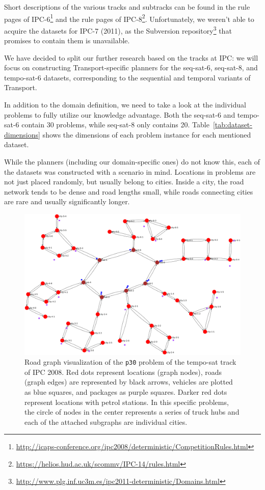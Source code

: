 Short descriptions of the various tracks and subtracks can be found in the rule pages of IPC-6\footnote{\url{http://icaps-conference.org/ipc2008/deterministic/CompetitionRules.html}}
and the rule pages of IPC-8\footnote{\url{https://helios.hud.ac.uk/scommv/IPC-14/rules.html}}.
Unfortunately, we weren't able to acquire the datasets for IPC-7 (2011), as the Subversion repository\footnote{\url{http://www.plg.inf.uc3m.es/ipc2011-deterministic/Domains.html}} that promises to contain them is unavailable.

We have decided to split our further research based on the tracks at IPC: we will focus on constructing
Transport-specific planners for the seq-sat-6, seq-sat-8, and tempo-sat-6 datasets,
corresponding to the sequential and temporal variants of Transport.

In addition to the domain definition, we need to take a look at the individual problems to fully utilize our knowledge advantage.
Both the seq-sat-6 and tempo-sat-6 contain 30 problems, while seq-sat-8 only contains 20. Table~\ref{tab:dataset-dimensions} shows the
dimensions of each problem instance for each mentioned dataset.

While the planners (including our domain-specific ones) do not know this,
each of the datasets was constructed with a scenario in mind. Locations in problems are not just
placed randomly, but usually belong to cities. Inside a city, the road network
tends to be dense and road lengths small, while roads connecting cities
are rare and usually significantly longer.


\begin{figure}[tb]
\begin{center}
\includegraphics[width=1.0\textwidth]{../img/ipc08_tempo-sat_p30_land}
\end{center}
\caption[Visualization of the \texttt{p30} problem of temporal Transport from IPC 2008.]{Road graph visualization of the \texttt{p30} problem of the tempo-sat track of IPC 2008. Red dots represent locations (graph nodes), roads (graph edges) are represented by black arrows, vehicles are plotted as blue squares, and packages as purple squares. Darker red dots represent locations with petrol stations. In this specific problems, the circle of nodes in the center represents a series of truck hubs and each of the attached subgraphs are individual cities.}
\label{fig:ipc08_tempo-sat_p30}
\end{figure}

